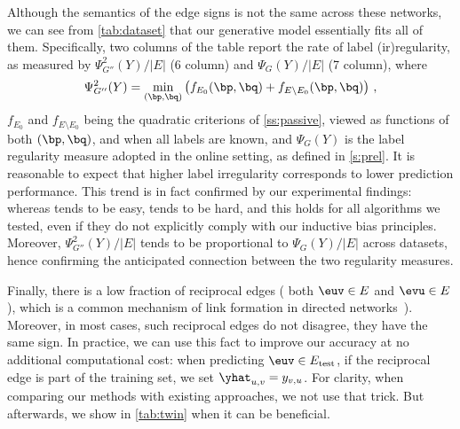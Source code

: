 Although the semantics of the edge signs is not the same across these networks, we can see from
\autoref{tab:dataset} that our generative model essentially fits all of them. Specifically,
two columns of the table report the rate of label (ir)regularity, as measured by
$\Psi^2_{G''}(Y)/|E|$ (6\thup{} column) and $\Psi_{G}(Y)/|E|$ (7\thup{} column), where 
\[
\Psi^2_{G''}(Y) = \min_{(\bp,\bq)} \left(f_{E_0}(\bp,\bq) + f_{E\setminus E_0}(\bp,\bq)\right)\,,
\]
$f_{E_0}$ and $f_{E\setminus E_0}$ being the quadratic criterions of \autoref{ss:passive}, viewed as
functions of both $(\bp,\bq)$, and \yuv{} when all labels are known, and $\Psi_{G}(Y)$ is the
label regularity measure adopted in the online setting, as defined in \autoref{s:prel}. It is
reasonable to expect that higher label irregularity corresponds to lower prediction performance.
This trend is in fact confirmed by our experimental findings: whereas \epi{} tends to be easy,
\aut{} tends to be hard, and this holds for all algorithms we tested, even if they do not explicitly
comply with our inductive bias principles. Moreover, $\Psi^2_{G''}(Y)/|E|$ tends to be proportional
to $\Psi_{G}(Y)/|E|$ across datasets, hence confirming the anticipated connection between the two
regularity measures.

\begin{newcontent}
Finally, there is a low fraction of reciprocal edges (\ie{} both $\euv \in E$ and $\evu
\in E$), which is a common mechanism of link formation in directed
networks~\autocites{DirectedReciprocity04}{Reciprocity13}). Moreover, in most cases, such reciprocal edges do not disagree,
\ie{} they have the same sign. In practice, we can use this fact to improve our accuracy at no
additional computational cost: when predicting $\euv \in E_{\mathrm{test}}$, if the reciprocal edge
\evu{} is part of the training set, we set $\yhat_{u,v} = y_{v,u}$. For clarity, when comparing
our methods with existing approaches, we not use that trick. But afterwards, we show in
\autoref{tab:twin} when it can be beneficial.
\end{newcontent}

